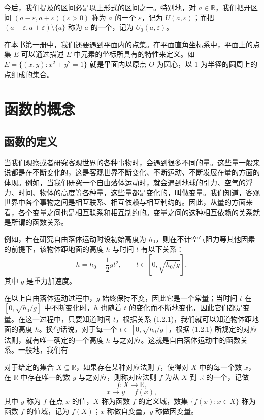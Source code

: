 \documentclass[UTF8,12pt,a4paper,fontset=fandol]{ctexbook}
\begin{document}
今后，我们提及的区间必是以上形式的区间之一。特别地，对 $a\in\mathbb{R}$，我们把开区间 $(a-\varepsilon,a+\varepsilon)(\varepsilon>0)$ 称为 $a$ 的一个 $\varepsilon$，记为 $U(a,\varepsilon)$；而把 $(a-\varepsilon,a+\varepsilon)\setminus\{a\}$ 称为 $a$ 的一个，记为 $U_0(a,\varepsilon)$。

在本书第一册中，我们还要遇到平面内的点集。在平面直角坐标系中，平面上的点集 $E$ 可以通过描述 $E$ 中元素的坐标所具有的特性来定义。如 $E=\{(x,y):x^2+y^2=1\}$ 就是平面内以原点 $O$ 为圆心，以 $1$ 为半径的圆周上的点组成的集合。

\section{函数的概念}

\subsection{函数的定义}

当我们观察或者研究客观世界的各种事物时，会遇到很多不同的量。这些量一般来说都是在不断变化的，这是客观世界不断变化、不断运动、不断发展在量的方面的体现。例如，当我们研究一个自由落体运动时，就会遇到地球的引力、空气的浮力、时间、物体的高度等各种量，这些量都是变化的，叫做变量。我们知道，客观世界中各个事物之间是相互联系、相互依赖与相互制约的。因此，从量的方面来看，各个变量之间也是相互联系和相互制约的。变量之间的这种相互依赖的关系就是所谓的函数关系。

例如，若在研究自由落体运动时设初始高度为 $h_0$，则在不计空气阻力等其他因素的前提下，该物体距地面的高度 $h$ 与时间 $t$ 有以下关系：
\begin{equation}
  h=h_0-\frac12gt^2,\qquad t\in[0,\sqrt{h_0/g}],
  \tag{1.2.1}
\end{equation}
其中 $g$ 是重力加速度。

在以上自由落体运动过程中，$g$ 始终保持不变，因此它是一个常量；当时间 $t$ 在 $[0,\sqrt{h_0/g}]$ 中不断变化时，$h$ 也随着 $t$ 的变化而不断地变化，因此它们都是变量。在这一过程中，只要知道时间 $t$，根据关系 (1.2.1)，我们就可以知道物体距地面的高度 $h$。换句话说，对于每一个 $t\in[0,\sqrt{h_0/g}]$，根据 (1.2.1) 所规定的对应法则，就有唯一确定的一个高度 $h$ 与之对应。这就是自由落体运动中的函数关系。一般地，我们有

\noindent{}\quad 对于给定的集合 $X\subseteq\mathbb{R}$，如果存在某种对应法则 $f$，使得对 $X$ 中的每一个数 $x$，在 $\mathbb{R}$ 中存在唯一的数 $y$ 与之对应，则称对应法则 $f$ 为从 $X$ 到 $\mathbb{R}$ 的一个，记做
\[
  f:X\to\mathbb{R},
\]
\[
  x\mapsto y=f(x),
\]
其中 $y$ 称为 $f$ 在点 $x$ 的值，$X$ 称为函数 $f$ 的定义域，数集 $\{f(x):x\in X\}$ 称为函数 $f$ 的值域，记为 $f(X)$；$x$ 称做自变量，$y$ 称做因变量。
\end{document}
